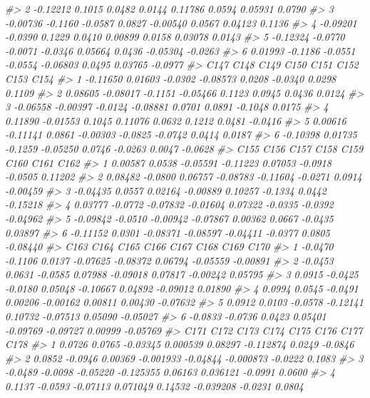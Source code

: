 \documentclass[]{book}
\newenvironment{Shaded}{\begin{snugshade}}{\end{snugshade}}
\newcommand{\CommentTok}[1]{\textcolor[rgb]{0.56,0.35,0.01}{\textit{#1}}}
\begin{document}
\begin{Shaded}
\begin{Highlighting}[]
{{{{{\CommentTok{#> 2 -0.12212  0.1015  0.0482  0.0144  0.11786 0.0594  0.05931  0.0790}
\CommentTok{#> 3 -0.00736 -0.1160 -0.0587  0.0827 -0.00540 0.0567  0.04123  0.1136}
\CommentTok{#> 4 -0.09201 -0.0390  0.1229  0.0410  0.00899 0.0158  0.03078  0.0143}
\CommentTok{#> 5 -0.12324 -0.0770 -0.0071 -0.0346  0.05664 0.0436 -0.05304 -0.0263}
\CommentTok{#> 6  0.01993 -0.1186 -0.0551 -0.0554 -0.06803 0.0495  0.03765 -0.0977}
\CommentTok{#>       C147     C148    C149     C150    C151    C152    C153    C154}
\CommentTok{#> 1 -0.11650  0.01603 -0.0302 -0.08573  0.0208 -0.0340  0.0298  0.1109}
\CommentTok{#> 2  0.08605 -0.08017 -0.1151 -0.05466  0.1123  0.0945  0.0436  0.0124}
\CommentTok{#> 3 -0.06558 -0.00397 -0.0124 -0.08881  0.0701  0.0891 -0.1048  0.0175}
\CommentTok{#> 4  0.11890 -0.01553  0.1045  0.11076  0.0632  0.1212  0.0481 -0.0416}
\CommentTok{#> 5  0.00616 -0.11141  0.0861 -0.00303 -0.0825 -0.0742  0.0414  0.0187}
\CommentTok{#> 6 -0.10398  0.01735 -0.1259 -0.05250  0.0746 -0.0263  0.0047 -0.0628}
\CommentTok{#>       C155    C156     C157     C158     C159    C160    C161     C162}
\CommentTok{#> 1  0.00587  0.0538 -0.05591 -0.11223  0.07053 -0.0918 -0.0505  0.11202}
\CommentTok{#> 2  0.08482 -0.0800  0.06757 -0.08783 -0.11604 -0.0271  0.0914 -0.00459}
\CommentTok{#> 3 -0.04435  0.0557  0.02164 -0.00889  0.10257 -0.1334  0.0442 -0.15218}
\CommentTok{#> 4  0.03777 -0.0772 -0.07832 -0.01604  0.07322 -0.0335 -0.0392 -0.04962}
\CommentTok{#> 5 -0.09842 -0.0510 -0.00942 -0.07867  0.00362  0.0667 -0.0435  0.03897}
\CommentTok{#> 6 -0.11152  0.0301 -0.08371 -0.08597 -0.04411 -0.0377  0.0805 -0.08440}
\CommentTok{#>      C163    C164    C165     C166     C167     C168     C169     C170}
\CommentTok{#> 1 -0.0470 -0.1106  0.0137 -0.07625 -0.08372  0.06794 -0.05559 -0.00891}
\CommentTok{#> 2 -0.0453  0.0631 -0.0585  0.07988 -0.09018  0.07817 -0.00242  0.05795}
\CommentTok{#> 3  0.0915 -0.0425 -0.0180  0.05048 -0.10667  0.04892 -0.09012  0.01890}
\CommentTok{#> 4  0.0994  0.0545 -0.0491  0.00206 -0.00162  0.00811  0.00430 -0.07632}
\CommentTok{#> 5  0.0912  0.0103 -0.0578 -0.12141  0.10732 -0.07513  0.05090 -0.05027}
\CommentTok{#> 6 -0.0833 -0.0736  0.0423  0.05401 -0.09769 -0.09727  0.00999 -0.05769}
\CommentTok{#>      C171    C172     C173      C174     C175      C176    C177    C178}
\CommentTok{#> 1  0.0726  0.0765 -0.03345  0.000539  0.08297 -0.112874  0.0249 -0.0846}
\CommentTok{#> 2  0.0852 -0.0946  0.00369 -0.001933 -0.04844 -0.000873 -0.0222  0.1083}
\CommentTok{#> 3 -0.0489 -0.0098 -0.05220 -0.125355  0.06163  0.036121 -0.0991  0.0600}
\CommentTok{#> 4  0.1137 -0.0593 -0.07113  0.071049  0.14532 -0.039208 -0.0231  0.0804}
}}}}}
\end{Highlighting}
\end{Shaded}
\end{document}
